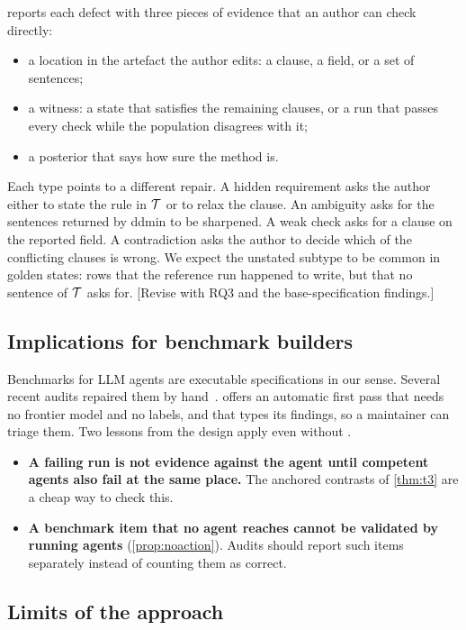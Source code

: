 \specdx reports each defect with three pieces of evidence that an author can check directly:
\begin{itemize}[leftmargin=*]
\item a location in the artefact the author edits: a clause, a field, or a set of sentences;
\item a witness: a state that satisfies the remaining clauses, or a run that passes every check while the population disagrees with it;
\item a posterior that says how sure the method is.
\end{itemize}
Each type points to a different repair. A hidden requirement asks the author either to state the rule in $\mathcal{T}$ or to relax the clause. An ambiguity asks for the sentences returned by ddmin to be sharpened. A weak check asks for a clause on the reported field. A contradiction asks the author to decide which of the conflicting clauses is wrong. We expect the unstated subtype to be common in golden states: rows that the reference run happened to write, but that no sentence of $\mathcal{T}$ asks for. [Revise with RQ3 and the base-specification findings.]

\subsection{Implications for benchmark builders}

Benchmarks for LLM agents are executable specifications in our sense. Several recent audits repaired them by hand~\cite{cuadron2025saber,zhu2025establishing,cao2026policy}. \specdx offers an automatic first pass that needs no frontier model and no labels, and that types its findings, so a maintainer can triage them. Two lessons from the design apply even without \specdx.
\begin{itemize}[leftmargin=*]
\item \textbf{A failing run is not evidence against the agent until competent agents also fail at the same place.} The anchored contrasts of \cref{thm:t3} are a cheap way to check this.
\item \textbf{A benchmark item that no agent reaches cannot be validated by running agents} (\cref{prop:noaction}). Audits should report such items separately instead of counting them as correct.
\end{itemize}

\subsection{Limits of the approach}

